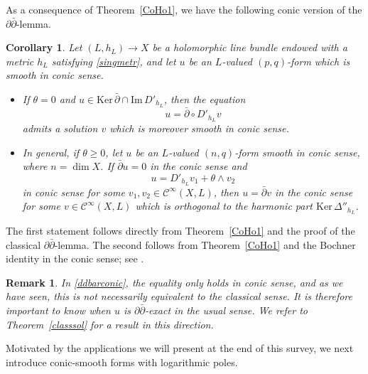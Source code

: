 \documentclass[english]{amsart}
\newcommand{\ddbar}{\partial\bar{\partial}}
\newcommand{\cC}{\mathcal{C}}
\newcommand{\im}{\mathrm{Im} \,}
\renewcommand{\ker}{\mathrm{Ker} \,}
\renewcommand{\ge}{\geqslant}
\newcommand{\dbar}{\bar \partial}
\newtheorem{cor}[thm]{Corollary}
\newtheorem{remark}[thm]{Remark}
\numberwithin{equation}{thm}
\begin{document}
As a consequence of Theorem~\ref{CoHo1}, we have the following conic version of the $\ddbar$-lemma.

\begin{cor}\label{conicddabr}
	Let $(L,h_L)\to X$ be a holomorphic line bundle endowed with a metric $h_L$ satisfying \eqref{singmetr}, and let $u$ be an $L$-valued $(p,q)$-form which is smooth in conic sense.
	\begin{itemize}
		\item If $\theta=0$ and $u\in \ker \dbar \cap \im D'_{h_L}$, then the equation
		\begin{equation}\label{ddbarconic}
		u=\dbar\circ D'_{h_L} v
		\end{equation}
		admits a solution $v$ which is moreover smooth in conic sense. 
		\item In general, if $\theta\ge 0$, let $u$ be an $L$-valued $(n,q)$-form smooth in conic sense, where $n=\dim X$.
		If $\dbar u=0$ in the conic sense and
		\[
		u = D'_{h_L} v_1 + \theta\wedge v_2
		\]
		in conic sense for some $v_1,v_2\in \cC^\infty(X,L)$, then $u=\dbar v$ in the conic sense for some $v\in \cC^\infty(X,L)$ which is orthogonal to the harmonic part $\ker \Delta''_{h_L}$.
	\end{itemize}
\end{cor}

The first statement follows directly from Theorem~\ref{CoHo1} and the proof of the classical $\ddbar$-lemma. The second follows from Theorem~\ref{CoHo1} and the Bochner identity in the conic sense; see \cite[Prop.~2.21]{JCMP}. 

\begin{remark} In \eqref{ddbarconic}, the equality only holds in conic sense, and as we have seen, this is not necessarily equivalent to the classical sense. It is therefore important to know when $u$ is $\ddbar$-exact in the usual sense. We refer to Theorem~\ref{classsol} for a result in this direction.
	\end{remark}

\medskip

Motivated by the applications we will present at the end of this survey, we next introduce conic-smooth forms with logarithmic poles.
\end{document}
